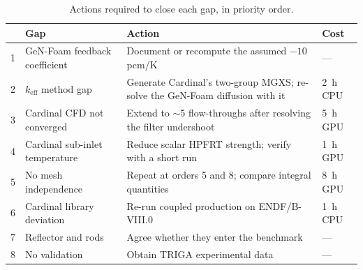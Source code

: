 \documentclass[11pt,a4paper]{article}
\newcommand{\keff}{\ensuremath{k_{\mathrm{eff}}}}
\begin{document}
\begin{table}[H]\centering\small
\caption{Actions required to close each gap, in priority order.}
\begin{tabular}{@{}rlp{58mm}l@{}}
\toprule
& \textbf{Gap} & \textbf{Action} & \textbf{Cost}\\
\midrule
1 & GeN-Foam feedback coefficient & Document or recompute the assumed $-10$\,pcm/K & ---\\
2 & \keff{} method gap & Generate Cardinal's two-group MGXS; re-solve the GeN-Foam diffusion with it & \SI{2}{\hour} CPU\\
3 & Cardinal CFD not converged & Extend to $\sim$5 flow-throughs after resolving the filter undershoot & \SI{5}{\hour} GPU\\
4 & Cardinal sub-inlet temperature & Reduce scalar HPFRT strength; verify with a short run & \SI{1}{\hour} GPU\\
5 & No mesh independence & Repeat at orders 5 and 8; compare integral quantities & \SI{8}{\hour} GPU\\
6 & Cardinal library deviation & Re-run coupled production on ENDF/B-VIII.0 & \SI{1}{\hour} CPU\\
7 & Reflector and rods & Agree whether they enter the benchmark & ---\\
8 & No validation & Obtain TRIGA experimental data & ---\\
\bottomrule
\end{tabular}
\end{table}


\newpage
\end{document}
